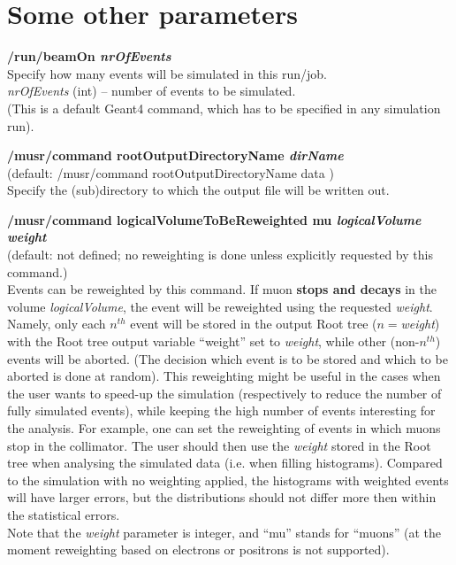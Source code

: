 \documentclass[twoside]{dis04}
\begin{document}
\section{Some other parameters}
\label{sec:otherParameters}
%
\begin{description}
\item{\bf /run/beamOn \emph{nrOfEvents}}\\
	Specify how many events will be simulated in this run/job.\\
	\emph{nrOfEvents} (int) -- number of events to be simulated.\\
	(This is a default Geant4 command, which has to be specified in any simulation run).

\item{\bf /musr/command rootOutputDirectoryName \emph{dirName}} \\
        (default: /musr/command rootOutputDirectoryName data )\\
        Specify the (sub)directory to which the output file will be written out.

\item{\bf /musr/command logicalVolumeToBeReweighted mu \emph{logicalVolume} \emph{weight} }\\
	(default: not defined; no reweighting is done unless explicitly requested by this command.) \\
	Events can be reweighted by this command.  If muon {\bf stops and decays} in the
	volume \emph{logicalVolume}, the event will be reweighted using the requested \emph{weight}.  
	Namely, only each $n^{th}$ event will be stored in the output Root tree ($n=$\emph{weight})
	with the Root tree output variable 
	``weight'' set to \emph{weight}, while other (non-$n^{th}$) events
	will be aborted. (The decision which event is to be stored and which to be aborted is
	done at random).  This reweighting might be useful in the cases when the user wants to speed-up the
	simulation (respectively to reduce the number of fully simulated events), while keeping
	the high number of events interesting for the analysis.  For example, one can set
	the reweighting of events in which muons stop in the collimator.  The user should then
	use the \emph{weight} stored in the Root tree when analysing the simulated data (i.e. when 
	filling histograms).  
	Compared to the simulation with no weighting applied, the histograms with weighted events
	will have larger errors, but the distributions should not differ more then within the
	statistical errors.\\
	Note that the \emph{weight} parameter is integer, and ``mu'' stands for ``muons''
	(at the moment reweighting based on electrons or positrons is not supported).


\end{description}
\end{document}
